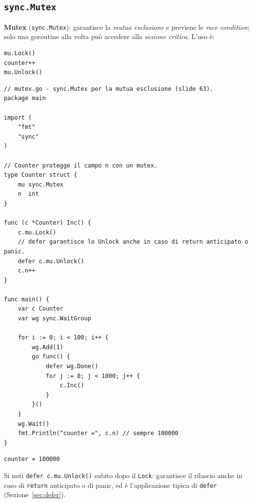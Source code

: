 \documentclass[11pt,a4paper]{report}
\newcommand{\cod}[1]{\texttt{#1}}
\begin{document}
\subsection{\texttt{sync.Mutex}}

\textbf{Mutex} (\cod{sync.Mutex}): garantisce la \emph{mutua esclusione} e
previene le \emph{race condition}; solo una goroutine alla volta può accedere
alla \emph{sezione critica}. L'uso è:

\begin{lstlisting}[style=gocode,numbers=none]
mu.Lock()
counter++
mu.Unlock()
\end{lstlisting}

\begin{lstlisting}[style=gocode,caption={\texttt{06\_concurrency/mutex.go}}]
// mutex.go - sync.Mutex per la mutua esclusione (slide 63).
package main

import (
	"fmt"
	"sync"
)

// Counter protegge il campo n con un mutex.
type Counter struct {
	mu sync.Mutex
	n  int
}

func (c *Counter) Inc() {
	c.mu.Lock()
	// defer garantisce lo Unlock anche in caso di return anticipato o panic.
	defer c.mu.Unlock()
	c.n++
}

func main() {
	var c Counter
	var wg sync.WaitGroup

	for i := 0; i < 100; i++ {
		wg.Add(1)
		go func() {
			defer wg.Done()
			for j := 0; j < 1000; j++ {
				c.Inc()
			}
		}()
	}
	wg.Wait()
	fmt.Println("counter =", c.n) // sempre 100000
}
\end{lstlisting}
\begin{lstlisting}[style=output]
counter = 100000
\end{lstlisting}

Si noti \cod{defer c.mu.Unlock()} subito dopo il \cod{Lock}: garantisce il
rilascio anche in caso di \cod{return} anticipato o di panic, ed è l'applicazione
tipica di \cod{defer} (Sezione~\ref{sec:defer}).
\end{document}
